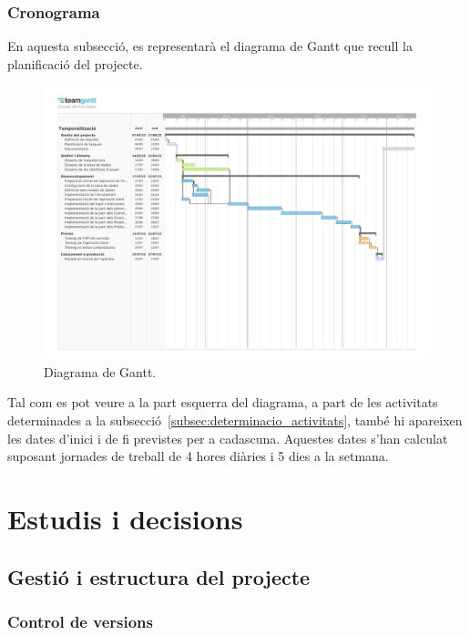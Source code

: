 \documentclass[a4paper,12pt]{ThesisStyle}
\begin{document}
\subsection{Cronograma}
\label{subsec:cronograma}

En aquesta subsecció, es representarà el diagrama de Gantt que recull la planificació del projecte.

\begin{figure}[H]
  \centering
  \includegraphics[width=1.3\textwidth, angle=90]{assets/planification_figs/ganttDiagram.pdf}
  \caption{\label{img:diagrama_gantt}Diagrama de Gantt.}
\end{figure}

Tal com es pot veure a la part esquerra del diagrama, a part de les activitats determinades a la subsecció~\ref{subsec:determinacio_activitats}, també hi apareixen les dates d'inici i de fi previstes per a cadascuna. Aquestes dates s'han calculat suposant jornades de treball de 4 hores diàries i 5 dies a la setmana.


\chapter{Estudis i decisions}
\label{cap:estudi}

\section{Gestió i estructura del projecte}
\label{sec:decisions_estructura}

\subsection{Control de versions}
\label{subsec:decisions_estructura_versions}
\end{document}
